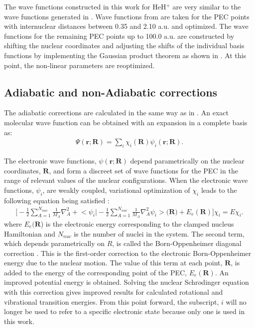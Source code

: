 \documentclass[aps,onecolumn]{revtex4}
\begin{document}
The wave functions constructed in this work for HeH$^+$ are very similar to the wave functions
generated in 
\cite{HeH+_Wei2012}. Wave functions from \cite{HeH+_Wei2012} are taken for the PEC points with
internuclear distances between 0.35 and 2.10 a.u. and optimized. The wave functions for the remaining PEC
points up to 100.0 a.u. are constructed by shifting the nuclear coordinates and adjusting
the shifts of the individual basis functions by implementing the Gaussian product theorem as shown
in \cite{GPT}. At this point, the non-linear parameters are reoptimized.

\subsection{Adiabatic and non-Adiabatic corrections}
The adiabatic corrections are calculated in the same way as in \cite{HeH+_Wei2012}.
An exact molecular wave function can be obtained with an expansion 
in a complete basis as:
\begin{eqnarray}
\Psi(\mathbf{r};\mathbf{R}) = \sum_{i}\chi_i(\mathbf{R})\psi_i(\mathbf{r};\mathbf{R}).
\end{eqnarray}

The electronic wave functions, $\psi(\mathbf{r};\mathbf{R})$ depend parametrically on the
nuclear coordinates, $\mathbf{R}$, and form a discreet set of 
wave functions for the PEC in the range
of relevant values of the nuclear configurations. 
When the electronic wave functions, $\psi_i$, are weakly coupled,
variational optimization of $\chi_i$ leads to the following equation being satisfied \cite{Adiabatic1}:
\begin{eqnarray}
\bigg[-\frac{1}{2}\sum_{A=1}^{N_{nuc}}\frac{1}{M_A}\nabla_A^2 + \bigg<\psi_i\bigg|-\frac{1}{2}
\sum_{A=1}^{N_{nuc}}\frac{1}{M_A}
\nabla_A^2\psi_i\bigg>\bigg(\mathbf{R}\bigg) + E_e(\mathbf{R})\bigg]\chi_i = E\chi_i.
\end{eqnarray}
where $E_e(\mathbf{R}$) is the electronic energy 
corresponding to the clamped nucleus Hamiltonian and $N_{nuc}$
is the number of nuclei in the system. The second term,
which depends parametrically on $R$, is called the Born-Oppenheimer diagonal correction \cite{Adiabatic1,
Adiabatic2}. This is the first-order correction to the electronic Born-Oppenheimer energy due to the nuclear motion.
The value of this term at each point, $\mathbf{R}$, is added to the energy 
of the corresponding point of the PEC, $E_e(\mathbf{R})$.
An improved potential energy is obtained. Solving the nuclear Schr$\ddot{o}$dinger equation with
this correction gives improved results for calculated rotational and vibrational transition energies.
From this point forward, the subscript, $i$ will no longer be used to refer to a specific electronic
state because only one is used in this work.
\end{document}
